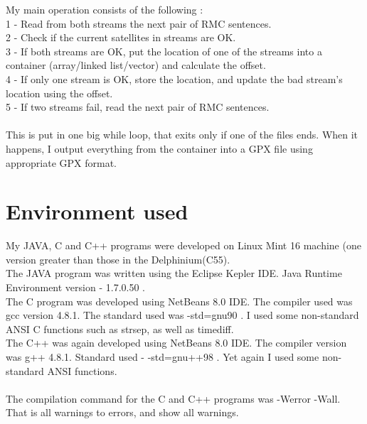 \documentclass[a4paper]{article}
\begin{document}
My main operation consists of the following : \\
1 - Read from both streams the next pair of RMC sentences. \\
2 - Check if the current satellites in streams are OK. \\
3 - If both streams are OK, put the location of one of the streams into a container (array/linked list/vector) and calculate the offset. \\
4 - If only one stream is OK, store the location, and update the bad stream's location using the offset. \\
5 - If two streams fail, read the next pair of RMC sentences.  \\
\\
This is put in one big while loop, that exits only if one of the files ends. When it happens, I output everything from the container into a GPX file using appropriate GPX format.
\section{Environment used}
 
My JAVA, C and C++ programs were developed on Linux Mint 16 machine (one version greater than those in the Delphinium(C55).\\
The JAVA program was written using the Eclipse Kepler IDE. Java Runtime Environment version - 1.7.0.50 . \\ 
The C program was developed using NetBeans 8.0 IDE. The compiler used was gcc version 4.8.1. The standard used was -std=gnu90 . I used some non-standard ANSI C functions such as strsep, as well as timediff. \\
The C++ was again developed using NetBeans 8.0 IDE. The compiler version was g++ 4.8.1. Standard used - -std=gnu++98 .
Yet again I used some non-standard ANSI  functions. \\ \\
The compilation command for the C and C++ programs was -Werror -Wall. That is all warnings to errors, and show all warnings.
\end{document}
